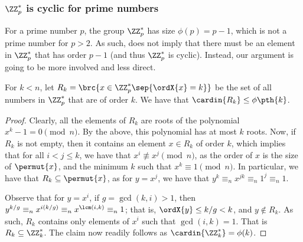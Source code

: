 \subsubsection{$\ZZ_p^*$ is cyclic for prime numbers}

For a prime number $p$, the group $\ZZ_p^*$ has size $\phi(p) = p-1$,
which is not a prime number for $p>2$.  As such,
 does not imply that there must be an element in
$\ZZ_p^*$ that has order $p-1$ (and thus $\ZZ_p^*$ is
cyclic). Instead, our argument is going to be more involved and less
direct.


\begin{lemma}
    For $k < n$, let
    \begin{math}
        R_k = \brc{ x \in \ZZ_p^* \sep{ \ordX{x} = k}}
    \end{math}
    be the set of all numbers in $\ZZ_p^*$ that are of order $k$. We
    have that $\cardin{R_k} \leq \phi\pth{k}$.
\end{lemma}

\begin{proof}
    Clearly, all the elements of $R_k$ are roots of the polynomial
    $x^k - 1 = 0 \pmod{n}$. By the above, this polynomial has at most
    $k$ roots.  Now, if $R_k$ is not empty, then it contains an
    element $x \in R_k$ of order $k$, which implies that for all $i <
    j \leq k$, we have that $x^i \nequiv x^j \pmod{n}$, as the order
    of $x$ is the size of $\permut{x}$, and the minimum $k$ such that
    $x^k \equiv 1 \pmod{n}$. In particular, we have that $R_k
    \subseteq \permut{x}$, as for $y = x^j$, we have that $y^k
    \equiv_n x^{jk} \equiv_n 1^j \equiv_n 1$.

    Observe that for $y = x^i$, if $g= \gcd(k,i)> 1$, then $y^{k/g}
    \equiv_n x^{i(k/g)} \equiv_n x^{\lcm(i,k)} \equiv_n 1$; that is,
    $\ordX{y} \leq k/g < k$, and $y \notin R_k$. As such, $R_k$
    contains only elements of $x^i$ such that $\gcd(i,k)=1$. That is
    $R_k \subseteq \ZZ_k^*$. The claim now readily follows as
    $\cardin{\ZZ_k^*} = \phi(k)$.
\end{proof}



